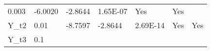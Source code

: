 \documentclass{article}
\begin{document}
\begin{longtable}[c]{@{}lllllll@{}}
\begin{minipage}[t]{0.09\columnwidth}\raggedright\strut
0.003
\strut\end{minipage} &
\begin{minipage}[t]{0.15\columnwidth}\raggedright\strut
-6.0020
\strut\end{minipage} &
\begin{minipage}[t]{0.18\columnwidth}\raggedright\strut
-2.8644
\strut\end{minipage} &
\begin{minipage}[t]{0.12\columnwidth}\raggedright\strut
1.65E-07
\strut\end{minipage} &
\begin{minipage}[t]{0.15\columnwidth}\raggedright\strut
Yes
\strut\end{minipage} &
\begin{minipage}[t]{0.10\columnwidth}\raggedright\strut
Yes
\strut\end{minipage}\tabularnewline
\begin{minipage}[t]{0.11\columnwidth}\raggedright\strut
Y\_t2
\strut\end{minipage} &
\begin{minipage}[t]{0.09\columnwidth}\raggedright\strut
0.01
\strut\end{minipage} &
\begin{minipage}[t]{0.15\columnwidth}\raggedright\strut
-8.7597
\strut\end{minipage} &
\begin{minipage}[t]{0.18\columnwidth}\raggedright\strut
-2.8644
\strut\end{minipage} &
\begin{minipage}[t]{0.12\columnwidth}\raggedright\strut
2.69E-14
\strut\end{minipage} &
\begin{minipage}[t]{0.15\columnwidth}\raggedright\strut
Yes
\strut\end{minipage} &
\begin{minipage}[t]{0.10\columnwidth}\raggedright\strut
Yes
\strut\end{minipage}\tabularnewline
\begin{minipage}[t]{0.11\columnwidth}\raggedright\strut
Y\_t3
\strut\end{minipage} &
\begin{minipage}[t]{0.09\columnwidth}\raggedright\strut
0.1
\strut\end{minipage} &
\begin{minipage}[t]{0.15\columnwidth}\raggedright\strut

\end{minipage}
\end{longtable}
\end{document}

